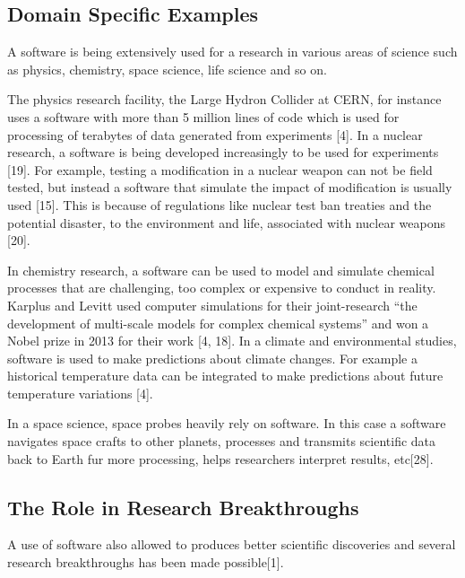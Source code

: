 \subsection{Domain Specific Examples}
A software is being extensively used for a research in various areas of science such as physics, chemistry, space science, life science and so on.

The physics research facility, the Large Hydron Collider at CERN, for instance uses a software with more than 5 million lines of code which is used for processing of terabytes of data generated from experiments [4].
In a nuclear research, a software is being developed increasingly to be used for experiments [19]. For example, testing a modification in a nuclear weapon can not be field tested, but instead a software that simulate the impact of modification is usually used [15]. This is because of regulations like nuclear test ban treaties and the potential disaster, to the environment and life, associated with nuclear weapons [20]. 

In chemistry research, a software can be used to model and simulate chemical processes that are challenging, too complex or expensive to conduct in reality. Karplus and Levitt used computer simulations for their joint-research “the development of multi-scale models for complex chemical systems”  and won a Nobel prize in 2013 for their work [4, 18]. 
In a climate and environmental studies, software is used to make predictions about climate changes. For example a historical temperature data can be integrated to make predictions about future temperature variations [4].

In a space science, space probes heavily rely on software. In this case a software navigates space crafts to other planets, processes and transmits scientific data back to Earth fur more processing, helps researchers interpret results, etc[28].


\subsection{The Role in Research Breakthroughs  }
A use of software also allowed to produces better scientific discoveries and several research breakthroughs has been made possible[1]. 

